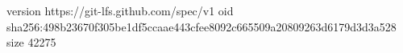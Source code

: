 version https://git-lfs.github.com/spec/v1
oid sha256:498b23670f305be1df5ccaae443cfee8092c665509a20809263d6179d3d3a528
size 42275

